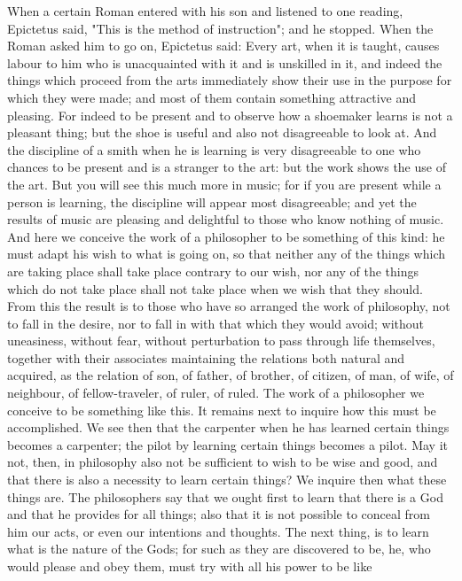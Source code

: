 \documentclass[a4paper]{article}
\begin{document}
    When a certain Roman entered with his son and listened to one reading,
Epictetus said, "This is the method of instruction"; and he stopped. When the
Roman asked him to go on, Epictetus said: Every art, when it is taught, causes
labour to him who is unacquainted with it and is unskilled in it, and indeed
the things which proceed from the arts immediately show their use in the
purpose for which they were made; and most of them contain something attractive
and pleasing. For indeed to be present and to observe how a shoemaker learns is
not a pleasant thing; but the shoe is useful and also not disagreeable to look
at. And the discipline of a smith when he is learning is very disagreeable to
one who chances to be present and is a stranger to the art: but the work shows
the use of the art. But you will see this much more in music; for if you are
present while a person is learning, the discipline will appear most
disagreeable; and yet the results of music are pleasing and delightful to those
who know nothing of music. And here we conceive the work of a philosopher to be
something of this kind: he must adapt his wish to what is going on, so that
neither any of the things which are taking place shall take place contrary to
our wish, nor any of the things which do not take place shall not take place
when we wish that they should. From this the result is to those who have so
arranged the work of philosophy, not to fall in the desire, nor to fall in with
that which they would avoid; without uneasiness, without fear, without
perturbation to pass through life themselves, together with their associates
maintaining the relations both natural and acquired, as the relation of son, of
father, of brother, of citizen, of man, of wife, of neighbour, of
fellow-traveler, of ruler, of ruled. The work of a philosopher we conceive to
be something like this. It remains next to inquire how this must be
accomplished.
    We see then that the carpenter when he has learned certain things becomes a
carpenter; the pilot by learning certain things becomes a pilot. May it not,
then, in philosophy also not be sufficient to wish to be wise and good, and
that there is also a necessity to learn certain things? We inquire then what
these things are. The philosophers say that we ought first to learn that there
is a God and that he provides for all things; also that it is not possible to
conceal from him our acts, or even our intentions and thoughts. The next thing,
is to learn what is the nature of the Gods; for such as they are discovered to
be, he, who would please and obey them, must try with all his power to be like
\end{document}

